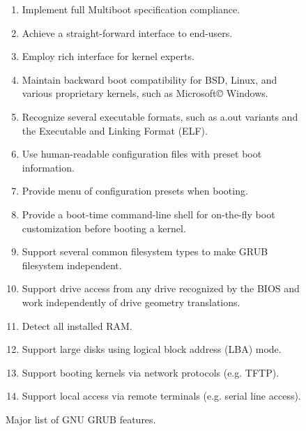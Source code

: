 	\begin{figure}[tb]
	  \begin{center}
	  \begin{minipage}{6in}
	  \begin{enumerate}

	  \item Implement full Multiboot specification compliance.

	  \item Achieve a straight-forward interface to end-users.

	  \item Employ rich interface for kernel experts.

	  \item Maintain backward boot compatibility for BSD, Linux, and
	    various proprietary kernels, such as Microsoft\copyright
	    Windows\texttrademark.

	  \item Recognize several executable formats, such as a.out variants
	    and the Executable and Linking Format (ELF).

	  \item Use human-readable configuration files with preset boot
	    information.

	  \item Provide menu of configuration presets when booting.

	  \item Provide a boot-time command-line shell for on-the-fly boot
	    customization before booting a kernel.

	  \item Support several common filesystem types to make GRUB
	    filesystem independent.

	  \item Support drive access from any drive recognized by the BIOS
	    and work independently of drive geometry translations.

	  \item Detect all installed RAM.

	  \item Support large disks using logical block address (LBA) mode.

	  \item Support booting kernels via network protocols (e.g. TFTP).

	  \item Support local access via remote terminals (e.g. serial line
	    access).
	  \end{enumerate}
	  \end{minipage}
	\end{center}
	\caption{Major list of GNU GRUB features.}
	\label{fig:grub_features}
	\end{figure}

